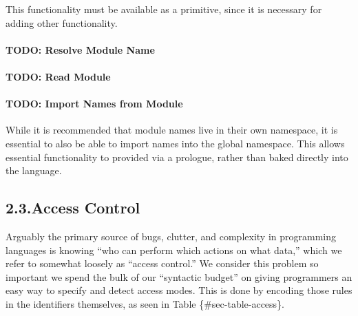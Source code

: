 \documentclass[preprint]{{acmart}}
\begin{document}
\noindent{}This functionality must be available as a primitive, since it is necessary
for adding other functionality.%

\paragraph{TODO: Resolve Module Name}\label{sec-todo--resolve-module-name}%

\paragraph{TODO: Read Module}\label{sec-todo--read-module}%

\paragraph{TODO: Import Names from Module}\label{sec-todo--import-names-from-module}%

\noindent{}While it is recommended that module names live in their own namespace,
it is essential to also be able to import names into the global namespace.
This allows essential functionality to provided via a prologue, rather than
baked directly into the language.%

\subsection{2.3.\hspace*{0.5em}Access Control}\label{sec-access}%

\noindent{}Arguably the primary source of bugs, clutter, and complexity in
programming languages is knowing \textquotedblleft{}who can perform which actions on what data,\textquotedblright{}
which we refer to somewhat loosely as \textquotedblleft{}access control.\textquotedblright{} We consider this
problem so important we spend the bulk of our \textquotedblleft{}syntactic budget\textquotedblright{} on
giving programmers an easy way to specify and detect access modes. This
is done by encoding those rules in the identifiers themselves, as seen in
Table \{\#sec-table-access\}.%
\end{document}
